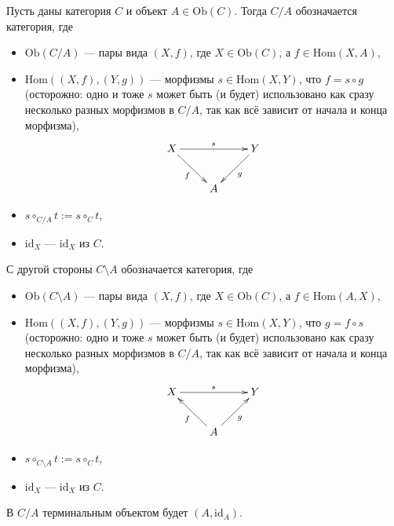 \documentclass[12pt,a4paper]{article}
\newcommand{\Hom}{\mathrm{Hom}}
\newcommand{\Ob}{\mathrm{Ob}}
\newcommand{\id}{\mathrm{id}}
\begin{document}
    \begin{definition}
        Пусть даны категория $C$ и объект $A \in \Ob(C)$. Тогда $C/A$ обозначается категория, где
        \begin{itemize}
            \item $\Ob(C/A)$ --- пары вида $(X, f)$, где $X \in \Ob(C)$, а $f \in \Hom(X, A)$,
            \item $\Hom((X, f), (Y, g))$ --- морфизмы $s \in \Hom(X, Y)$, что $f = s \circ g$ (осторожно: одно и тоже $s$ может быть (и будет) использовано как сразу несколько разных морфизмов в $C/A$, так как всё зависит от начала и конца морфизма),
                \[
                    \xymatrix{
                        X \ar[rd]_{f} \ar[rr]^{s} && Y \ar[ld]^{g}\\
                        & A
                    }
                \]
            \item $s \circ_{C/A} t := s \circ_C t$,
            \item $\id_{X}$ --- $\id_X$ из $C$.
        \end{itemize}
        С другой стороны $C\setminus A$ обозначается категория, где
        \begin{itemize}
            \item $\Ob(C\setminus A)$ --- пары вида $(X, f)$, где $X \in \Ob(C)$, а $f \in \Hom(A, X)$,
            \item $\Hom((X, f), (Y, g))$ --- морфизмы $s \in \Hom(X, Y)$, что $g = f \circ s$ (осторожно: одно и тоже $s$ может быть (и будет) использовано как сразу несколько разных морфизмов в $C/A$, так как всё зависит от начала и конца морфизма),
                \[
                    \xymatrix{
                        X \ar[rr]^{s} && Y\\
                        & A \ar[lu]^{f} \ar[ru]_{g}
                    }
                \]
            \item $s \circ_{C\setminus A} t := s \circ_C t$,
            \item $\id_{X}$ --- $\id_X$ из $C$.
        \end{itemize}
    \end{definition}

    \begin{example}
        В $C/A$ терминальным объектом будет $(A, \id_A)$.
    \end{example}
\end{document}
